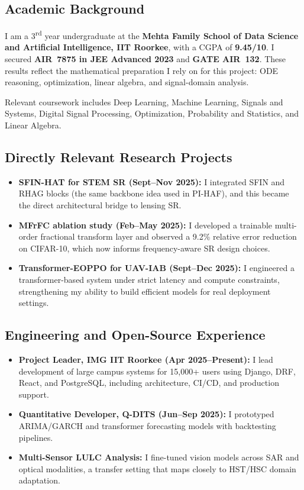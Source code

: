 \documentclass[11pt,a4paper]{article}
\begin{document}
\subsection{Academic Background}

I am a 3\textsuperscript{rd} year undergraduate at the \textbf{Mehta Family School of Data Science and Artificial Intelligence, IIT Roorkee}, with a CGPA of \textbf{9.45/10}. I secured \textbf{AIR~7875 in JEE Advanced 2023} and \textbf{GATE AIR~132}. These results reflect the mathematical preparation I rely on for this project: ODE reasoning, optimization, linear algebra, and signal-domain analysis.

Relevant coursework includes Deep Learning, Machine Learning, Signals and Systems, Digital Signal Processing, Optimization, Probability and Statistics, and Linear Algebra.

\subsection{Directly Relevant Research Projects}

\begin{itemize}
  \item \textbf{SFIN-HAT for STEM SR (Sept--Nov 2025):} I integrated SFIN and RHAG blocks (the same backbone idea used in PI-HAF), and this became the direct architectural bridge to lensing SR.
  \item \textbf{MFrFC ablation study (Feb--May 2025):} I developed a trainable multi-order fractional transform layer and observed a 9.2\% relative error reduction on CIFAR-10, which now informs frequency-aware SR design choices.
  \item \textbf{Transformer-EOPPO for UAV-IAB (Sept--Dec 2025):} I engineered a transformer-based system under strict latency and compute constraints, strengthening my ability to build efficient models for real deployment settings.
\end{itemize}

\subsection{Engineering and Open-Source Experience}

\begin{itemize}
  \item \textbf{Project Leader, IMG IIT Roorkee (Apr 2025--Present):} I lead development of large campus systems for 15,000+ users using Django, DRF, React, and PostgreSQL, including architecture, CI/CD, and production support.
  \item \textbf{Quantitative Developer, Q-DITS (Jun--Sep 2025):} I prototyped ARIMA/GARCH and transformer forecasting models with backtesting pipelines.
  \item \textbf{Multi-Sensor LULC Analysis:} I fine-tuned vision models across SAR and optical modalities, a transfer setting that maps closely to HST/HSC domain adaptation.
\end{itemize}
\end{document}
